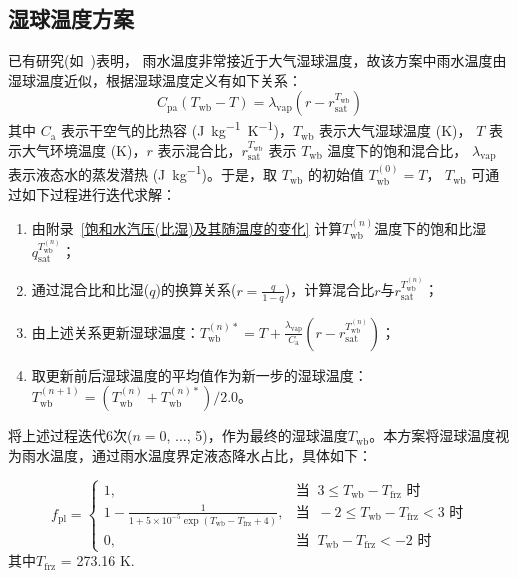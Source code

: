 \subsection{湿球温度方案}\label{湿球温度方案}
已有研究(如~\citet{anderson1998moored})表明，
雨水温度非常接近于大气湿球温度，故该方案中雨水温度由湿球温度近似，根据湿球温度定义有如下关系：
\begin{equation}
  \label{eq:湿球温度定义}
  C_{\mathrm{p a}}\left(T_{\mathrm{w b}}-T\right)=\lambda_{\mathrm{vap}}\left(r-r_{\mathrm{s a t}}^{T_{\mathrm{w b}}}\right)
\end{equation}
其中 $C_{\mathrm{a}}$ 表示干空气的比热容 (\unit{J.kg^{-1}.K^{-1}})，$T_{\mathrm{wb}}$ 表示大气湿球温度 (K)，
$T$ 表示大气环境温度 (K)，$r$ 表示混合比，$r_{\mathrm{sat}}^{T_{\mathrm{wb}}}$ 表示 $T_{\mathrm{wb}}$ 温度下的饱和混合比，
$\lambda_{\mathrm {vap}}$ 表示液态水的蒸发潜热 (\unit{J.kg^{-1}})。于是，取 $T_{\mathrm{wb}}$ 的初始值 $T_{\mathrm{wb}}^{\left(0\right)}=T$，
$T_{\mathrm{wb}}$ 可通过如下过程进行迭代求解：
\begin{enumerate}
  \item 由附录~\ref{饱和水汽压(比湿)及其随温度的变化} 计算$T_{\mathrm{wb}}^{\left(n\right)}$温度下的饱和比湿$q_{\mathrm{sat}}^{T_{\mathrm{wb}}^{\left(n\right)}}$；
  \item 通过混合比和比湿($q$)的换算关系($r=\frac{q}{1-q}$)，计算混合比$r$与$r_{\mathrm{sat}}^{T_{\mathrm{wb}}^{\left(n\right)}}$；
  \item 由上述关系更新湿球温度：$T_{\mathrm{wb}}^{\left(n\right)\ast}=T+\frac{\lambda_{\mathrm {vap}}}{C_{\mathrm{a}}}\left(r-r_{\mathrm{sat}}^{T_{\mathrm{wb}}^{\left(n\right)}}\right)$；
  \item 取更新前后湿球温度的平均值作为新一步的湿球温度：$T_{\mathrm{wb}}^{\left(n+1\right)}=\left(T_{\mathrm{wb}}^{\left(n\right)}+T_{\mathrm{wb}}^{\left(n\right)\ast}\right)/2.0$。
\end{enumerate}
将上述过程迭代6次($n=0$, $\ldots$, 5)，作为最终的湿球温度$T_{\mathrm{wb}}$。本方案将湿球温度视为雨水温度，通过雨水温度界定液态降水占比，具体如下：

\begin{equation}
  f_{\mathrm{pl}}= \begin{cases}
    1, & \text{当 }\ 3\leqslant T_{\mathrm{wb}} - T_{\mathrm{frz}} \text{ 时} \\
    1 - \frac{1}{1 + 5\times10^{-5}\exp{(T_{\mathrm{wb}} - T_{\mathrm{frz}}+4)}} , & \text{当 }\ -2\leqslant T_{\mathrm{wb}} - T_{\mathrm{frz}} < 3 \text{ 时} \\
    0, & \text{当 }\ T_{\mathrm{wb}} - T_{\mathrm{frz}} < -2 \text{ 时}
  \end{cases}
\end{equation}
%
其中$T_{\mathrm{frz}}$ = 273.16 K.


